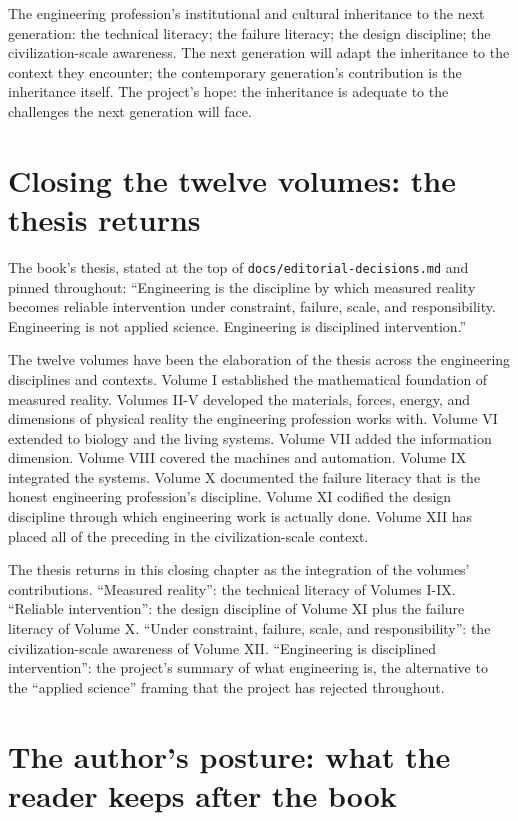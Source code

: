 The engineering profession's institutional and cultural inheritance to the next generation: the technical literacy; the failure literacy; the design discipline; the civilization-scale awareness. The next generation will adapt the inheritance to the context they encounter; the contemporary generation's contribution is the inheritance itself. The project's hope: the inheritance is adequate to the challenges the next generation will face.

\section{Closing the twelve volumes: the thesis returns}

The book's thesis, stated at the top of \texttt{docs/editorial-decisions.md} and pinned throughout: ``Engineering is the discipline by which measured reality becomes reliable intervention under constraint, failure, scale, and responsibility. Engineering is not applied science. Engineering is disciplined intervention.''

The twelve volumes have been the elaboration of the thesis across the engineering disciplines and contexts. Volume I established the mathematical foundation of measured reality. Volumes II-V developed the materials, forces, energy, and dimensions of physical reality the engineering profession works with. Volume VI extended to biology and the living systems. Volume VII added the information dimension. Volume VIII covered the machines and automation. Volume IX integrated the systems. Volume X documented the failure literacy that is the honest engineering profession's discipline. Volume XI codified the design discipline through which engineering work is actually done. Volume XII has placed all of the preceding in the civilization-scale context.

The thesis returns in this closing chapter as the integration of the volumes' contributions. ``Measured reality'': the technical literacy of Volumes I-IX. ``Reliable intervention'': the design discipline of Volume XI plus the failure literacy of Volume X. ``Under constraint, failure, scale, and responsibility'': the civilization-scale awareness of Volume XII. ``Engineering is disciplined intervention'': the project's summary of what engineering is, the alternative to the ``applied science'' framing that the project has rejected throughout.

\section{The author's posture: what the reader keeps after the book}

